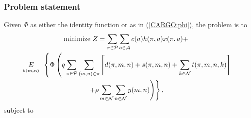 \subsubsection{Problem statement}

Given $\Phi$ as either the identity function or as in (\ref{CARGO:phi}), the problem is to
\begin{multline*}
\text{minimize } Z =  \sum_{\pi \in {\cal P}} \sum_{a \in {\cal A}} c(a) h(\pi, a) x(\pi, a) + \\
\expect[b(m,n)]\left\{\Phi \left( q \sum_{\pi \in {\cal P}} \sum_{(m,n)\in \pi} \left[ d(\pi, m, n) + s(\pi, m, n) + \sum_{k \in {\cal N}} t(\pi, m, n, k) \right] \right. \right.\\
\left. \left. + \rho \sum_{m \in {\cal N}} \sum_{n \in {\cal N}} y(m,n) \right) \right\},
\end{multline*}
subject to


